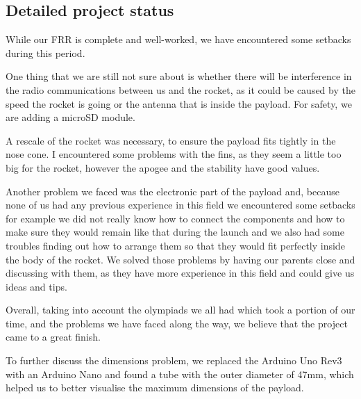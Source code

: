 \subsection{Detailed project status}

While our FRR is complete and well-worked, we have encountered some setbacks during this period. 

One thing that we are still not sure about is whether there will be interference in the radio communications between us and the rocket, as it could be caused by the speed the rocket is going or the antenna that is inside the payload. For safety, we are adding a microSD module. 

A rescale of the rocket was necessary, to ensure the payload fits tightly in the nose cone. I encountered some problems with the fins, as they seem a little too big for the rocket, however the apogee and the stability have good values.

Another problem we faced was the electronic part of the payload and, because none of us had any previous experience in this field we encountered some setbacks for example we did not really know how to connect the components and how to make sure they would remain like that during the launch and we also had some troubles finding out how to arrange them so that they would fit perfectly inside the body of the rocket. We solved those problems by having our parents close and discussing with them, as they have more experience in this field and could give us ideas and tips.

Overall, taking into account the olympiads we all had which took a portion of our time, and the problems we have faced along the way, we believe that the project came to a great finish.

To further discuss the dimensions problem, we replaced the Arduino Uno Rev3 with an Arduino Nano and found a tube with the outer diameter of 47mm, which helped us to better visualise the maximum dimensions of the payload. 

